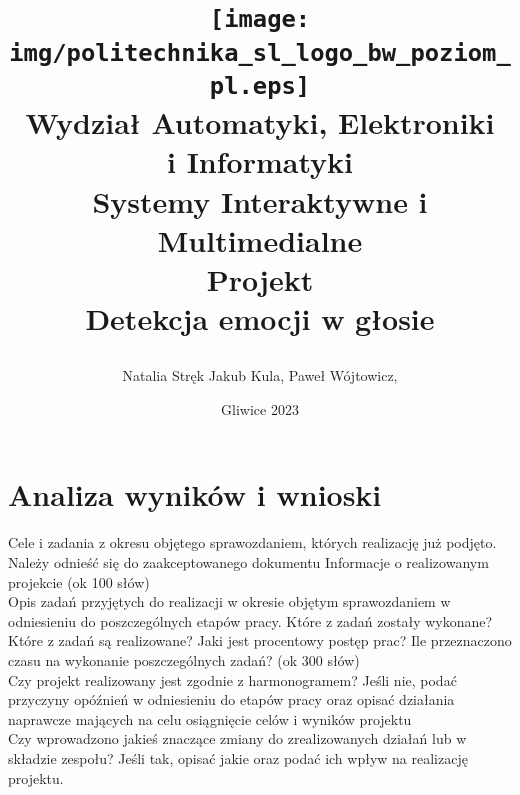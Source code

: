 \documentclass[12pt,titlepage]{article}
\title{
\texttt{[image: img/politechnika\_sl\_logo\_bw\_poziom\_pl.eps]}\\
\textbf{Wydział Automatyki, Elektroniki\\
i Informatyki}\\
\vspace*{1cm}
Systemy Interaktywne i Multimedialne \\ Projekt \\ Detekcja emocji w głosie

\vspace*{5cm}
}
\author{
Natalia Stręk
Jakub Kula,
Paweł Wójtowicz,
}
\date{Gliwice 2023}
\begin{document}
\maketitle

\tableofcontents

\newpage
\section{Analiza wyników i wnioski}
Cele i zadania z okresu objętego sprawozdaniem, których realizację już podjęto. Należy odnieść się do zaakceptowanego dokumentu Informacje o realizowanym projekcie (ok 100 słów)\\

Opis zadań przyjętych do realizacji w okresie objętym sprawozdaniem w odniesieniu do
poszczególnych etapów pracy. Które z zadań zostały wykonane? Które z zadań są realizowane? Jaki jest procentowy postęp prac? Ile przeznaczono czasu na wykonanie poszczególnych zadań? (ok 300 słów)\\

Czy projekt realizowany jest zgodnie z harmonogramem? Jeśli nie, podać przyczyny opóźnień w odniesieniu do etapów pracy oraz opisać działania naprawcze mających na celu osiągnięcie celów i wyników projektu\\

Czy wprowadzono jakieś znaczące zmiany do zrealizowanych działań lub w składzie zespołu? Jeśli tak, opisać jakie oraz podać ich wpływ na realizację projektu.
\end{document}
